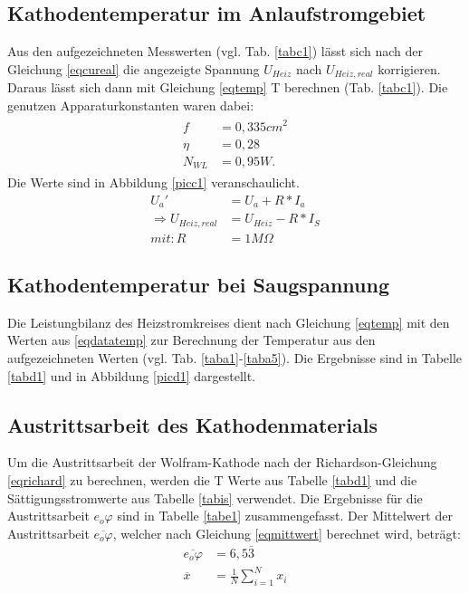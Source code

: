 \subsection{Kathodentemperatur im Anlaufstromgebiet}
Aus den aufgezeichneten Messwerten (vgl. Tab. \ref{tabc1}) lässt sich nach der Gleichung \ref{eqcureal}
die angezeigte Spannung $U_{Heiz}$ nach $U_{Heiz,real}$ korrigieren. Daraus lässt sich dann mit 
Gleichung \ref{eqtemp} T berechnen (Tab. \ref{tabc1}). Die genutzen Apparaturkonstanten waren dabei:
\begin{align}
\begin{split}
f&=0,335cm^2 \label{eqdatatemp}\\
\eta&=0,28\\
N_{WL}&=0,95W .
\end{split}
\end{align} 
Die Werte sind in Abbildung \ref{picc1} veranschaulicht.
\begin{align}
U_a'&=U_a+R*I_a\\
\Rightarrow U_{Heiz,real}&=U_{Heiz}-R*I_S \label{eqcureal}\\
mit: R&=1M\Omega
\end{align}

 
\FloatBarrier
\subsection{Kathodentemperatur bei Saugspannung}
Die Leistungbilanz des Heizstromkreises dient nach Gleichung \ref{eqtemp} mit den Werten aus \ref{eqdatatemp}
zur Berechnung der Temperatur aus den aufgezeichneten Werten (vgl. Tab. \ref{taba1}-\ref{taba5}). Die Ergebnisse
sind in Tabelle \ref{tabd1} und in Abbildung \ref{picd1} dargestellt. 
 
\FloatBarrier
\subsection{Austrittsarbeit des Kathodenmaterials}
Um die Austrittsarbeit der Wolfram-Kathode nach der Richardson-Gleichung \ref{eqrichard} zu berechnen,
werden die T Werte aus Tabelle \ref{tabd1} und die Sättigungsstromwerte aus Tabelle \ref{tabis}
verwendet. Die Ergebnisse für die Austrittsarbeit $e_o\varphi$ sind in Tabelle \ref{tabe1} zusammengefasst.
Der Mittelwert der Austrittsarbeit $\overline{e_o\varphi}$, welcher nach Gleichung \ref{eqmittwert} berechnet
wird, beträgt:
\begin{align}
\overline{e_o\varphi}&=6{,}5\overline{3} \label{eqphi} \\
\overline{x}&=\frac{1}{N}\sum\limits_{i=1}^N x_i \label{eqmittwert}
\end{align}

\FloatBarrier

